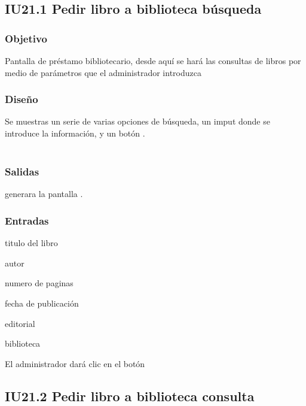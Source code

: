 \newpage
\subsection{IU21.1 Pedir libro a biblioteca búsqueda}

\subsubsection{Objetivo}
	Pantalla de préstamo bibliotecario, desde aquí se hará las consultas de libros por medio de parámetros que el administrador introduzca

\subsubsection{Diseño}
	Se muestras un serie de varias opciones de búsqueda, un imput donde se introduce la información, y un botón .  \\\\


\subsubsection{Salidas}
	\begin{Citemize}
		\item generara la pantalla . 
	\end{Citemize}
	
\subsubsection{Entradas}
	\begin{Citemize}
		\item titulo del libro 
		\item autor
		\item numero de paginas
		\item fecha de publicación
		\item editorial
		\item biblioteca
		\item El administrador dará clic en el botón \IUbutton{Buscar}
	\end{Citemize}


\subsection{IU21.2 Pedir libro a biblioteca consulta}

